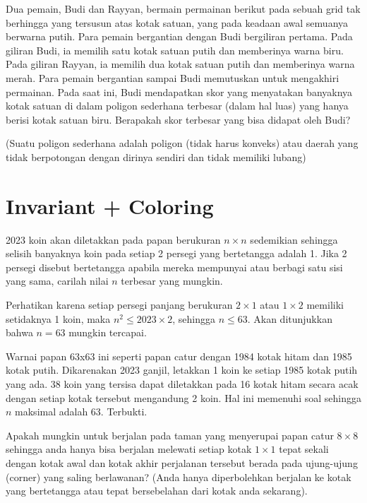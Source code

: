 \documentclass[11pt]{scrartcl}
\begin{document}
\begin{soaljawab}
Dua pemain, Budi dan Rayyan, bermain permainan berikut pada sebuah grid tak berhingga yang tersusun atas kotak satuan, yang pada keadaan awal semuanya berwarna putih. Para pemain bergantian dengan Budi bergiliran pertama. Pada giliran Budi, ia memilih satu kotak satuan putih dan memberinya warna biru. Pada giliran Rayyan, ia memilih dua kotak satuan putih dan memberinya warna merah. Para pemain bergantian sampai Budi memutuskan untuk mengakhiri permainan. Pada saat ini, Budi mendapatkan skor yang menyatakan banyaknya kotak satuan di dalam poligon sederhana terbesar (dalam hal luas) yang hanya berisi kotak satuan biru. Berapakah skor terbesar yang bisa didapat oleh Budi?

(Suatu poligon sederhana adalah poligon (tidak harus konveks) atau daerah yang tidak berpotongan dengan dirinya sendiri dan tidak memiliki lubang)
\end{soaljawab}

\section{Invariant + Coloring}
\begin{soaljawab}
    2023 koin akan diletakkan pada papan berukuran $n \times n$ sedemikian sehingga selisih banyaknya koin pada setiap 2 persegi yang bertetangga adalah 1. Jika 2 persegi disebut bertetangga apabila mereka mempunyai atau berbagi satu sisi yang sama, carilah nilai $n$ terbesar yang mungkin.
        \begin{solusi}
        Perhatikan karena setiap persegi panjang berukuran $2 \times 1$ atau $1 \times 2$ memiliki setidaknya 1 koin, maka $n^2 \le 2023 \times 2$, sehingga $n \le 63$. Akan ditunjukkan bahwa $n=63$ mungkin tercapai.

        Warnai papan 63x63 ini seperti papan catur dengan 1984 kotak hitam dan 1985 kotak putih. Dikarenakan 2023 ganjil, letakkan 1 koin ke setiap 1985 kotak putih yang ada. 38 koin yang tersisa dapat diletakkan pada 16 kotak hitam secara acak dengan setiap kotak tersebut mengandung 2 koin. Hal ini memenuhi soal sehingga $n$ maksimal adalah 63. Terbukti.
    \end{solusi}
\end{soaljawab}

\begin{soaljawab}
    Apakah mungkin untuk berjalan pada taman yang menyerupai papan catur $8 \times 8$ sehingga anda hanya bisa berjalan melewati setiap kotak $1 \times 1$ tepat sekali dengan kotak awal dan kotak akhir perjalanan tersebut berada pada ujung-ujung (corner) yang saling berlawanan? (Anda hanya diperbolehkan berjalan ke kotak yang bertetangga atau tepat bersebelahan dari kotak anda sekarang).
\end{soaljawab}
\end{document}
